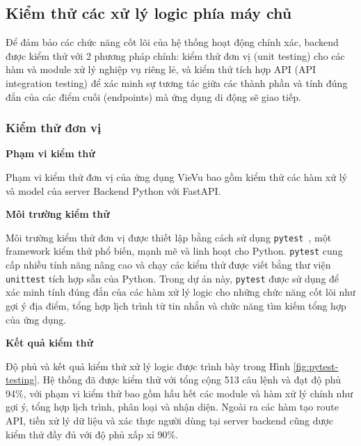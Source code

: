 
\subsection{Kiểm thử các xử lý logic phía máy chủ}

Để đảm bảo các chức năng cốt lõi của hệ thống hoạt động chính xác, backend được kiểm thử với 2 phương pháp chính: kiểm thử đơn vị (unit testing) cho các hàm và module xử lý nghiệp vụ riêng lẻ, và kiểm thử tích hợp API (API integration testing) để xác minh sự tương tác giữa các thành phần và tính đúng đắn của các điểm cuối (endpoints) mà ứng dụng di động sẽ giao tiếp.

\subsubsection{Kiểm thử đơn vị}

\textbf{Phạm vi kiểm thử}

\noindent Phạm vi kiểm thử đơn vị của ứng dụng VieVu bao gồm kiểm thử các hàm xử lý và model của server Backend Python với FastAPI. 

\noindent
\textbf{Môi trường kiểm thử}

\noindent Môi trường kiểm thử đơn vị được thiết lập bằng cách sử dụng \texttt{pytest}~\cite{pytest}, một framework kiểm thử phổ biến, mạnh mẽ và linh hoạt cho Python. \texttt{pytest} cung cấp nhiều tính năng nâng cao và chạy các kiểm thử được viết bằng thư viện \texttt{unittest} tích hợp sẵn của Python. Trong dự án này, \texttt{pytest} được sử dụng để xác minh tính đúng đắn của các hàm xử lý logic cho những chức năng cốt lõi như gợi ý địa điểm, tổng hợp lịch trình từ tin nhắn và chức năng tìm kiếm tổng hợp của ứng dụng.

\noindent
\textbf{Kết quả kiểm thử}

\noindent Độ phủ và kết quả kiểm thử xử lý logic được trình bày trong Hình \ref{fig:pytest-testing}. Hệ thống đã được kiểm thử với tổng cộng 513 câu lệnh và đạt độ phủ 94\%, với phạm vi kiểm thử bao gồm hầu hết các module và hàm xử lý chính như gợi ý, tổng hợp lịch trình, phân loại và nhận diện. Ngoài ra các hàm tạo route API, tiền xử lý dữ liệu và xác thực người dùng tại server backend cũng dược kiểm thử đầy đủ với độ phủ xấp xỉ 90\%.




